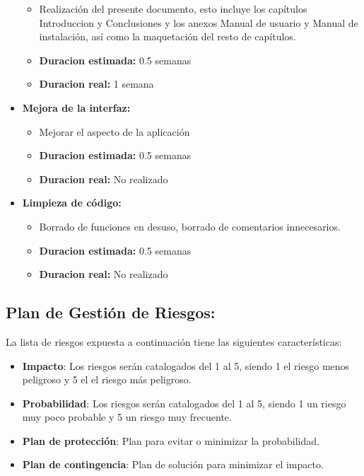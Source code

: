 \documentclass[openright,twoside,10pt]{book}
\providecommand{\tightlist}{%
  \setlength{\itemsep}{0pt}\setlength{\parskip}{0pt}}
\begin{document}
\begin{itemize}
      \begin{itemize}
      \tightlist
      \item
        Realización del presente documento, esto incluye los capítulos
        Introduccion y Conclusiones y los anexos Manual de usuario y Manual
        de instalación, así como la maquetación del resto de capítulos.
      \item
        \textbf{Duracion estimada:} 0.5 semanas
      \item
        \textbf{Duracion real:} 1 semana
      \end{itemize}
    \item
      \textbf{Mejora de la interfaz:}
    
      \begin{itemize}
      \tightlist
      \item
        Mejorar el aspecto de la aplicación
      \item
        \textbf{Duracion estimada:} 0.5 semanas
      \item
        \textbf{Duracion real:} No realizado
      \end{itemize}
    \item
      \textbf{Limpieza de código:}
    
      \begin{itemize}
      \tightlist
      \item
        Borrado de funciones en desuso, borrado de comentarios innecesarios.
      \item
        \textbf{Duracion estimada:} 0.5 semanas
      \item
        \textbf{Duracion real:} No realizado
      \end{itemize}
    \end{itemize}
    
    \newpage
    
    \subsection{Plan de Gestión de
    Riesgos:}\label{plan-de-gestiuxf3n-de-riesgos}
    
    La lista de riesgos expuesta a continuación tiene las siguientes
    características:
    
    \begin{itemize}
    \item
      \textbf{Impacto}: Los riesgos serán catalogados del 1 al 5, siendo 1
      el riesgo menos peligroso y 5 el el riesgo más peligroso.
    \item
      \textbf{Probabilidad}: Los riesgos serán catalogados del 1 al 5,
      siendo 1 un riesgo muy poco probable y 5 un riesgo muy frecuente.
    \item
      \textbf{Plan de protección}: Plan para evitar o minimizar la
      probabilidad.
    \item
      \textbf{Plan de contingencia}: Plan de solución para minimizar el
      impacto.
    \end{itemize}
    
\end{document}
